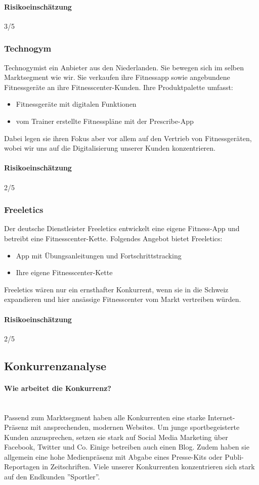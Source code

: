 \paragraph{Risikoeinschätzung} \qquad {} 3/5
\pagebreak
\subsubsection{Technogym}
Technogym\cite{technogym}ist ein Anbieter aus den Niederlanden. Sie bewegen sich im selben Marktsegment wie wir. Sie verkaufen ihre Fitnessapp sowie angebundene Fitnessgeräte an ihre Fitnesscenter-Kunden.
Ihre Produktpalette umfasst:
\begin{itemize}
	\item Fitnessgeräte mit digitalen Funktionen
	\item vom Trainer erstellte Fitnesspläne mit der Prescribe-App
\end{itemize}
Dabei legen sie ihren Fokus aber vor allem auf den Vertrieb von Fitnessgeräten, wobei wir uns auf die Digitalisierung unserer Kunden konzentrieren.
\paragraph{Risikoeinschätzung} \qquad {} 2/5
\subsubsection{Freeletics}
Der deutsche Dienstleister Freeletics\cite{freeletics} entwickelt eine eigene Fitness-App und betreibt eine Fitnesscenter-Kette.
Folgendes Angebot bietet Freeletics:
\begin{itemize}
	\item App mit Übungsanleitungen und Fortschrittstracking
	\item Ihre eigene Fitnesscenter-Kette
\end{itemize}
Freeletics wären nur ein ernsthafter Konkurrent, wenn sie in die Schweiz expandieren und hier ansässige Fitnesscenter vom Markt vertreiben würden.
\paragraph{Risikoeinschätzung} \qquad {} 2/5
\subsection{Konkurrenzanalyse}
\paragraph{Wie arbeitet die Konkurrenz?} \hfill \\
Passend zum Marktsegment haben alle Konkurrenten eine starke Internet-Präsenz mit ansprechenden, modernen Websites. 
Um junge sportbegeisterte Kunden anzusprechen, setzen sie stark auf Social Media Marketing über Facebook, Twitter und Co. Einige betreiben auch einen Blog. Zudem haben sie allgemein eine hohe Medienpräsenz mit Abgabe eines Presse-Kits oder Publi-Reportagen in Zeitschriften. Viele unserer Konkurrenten konzentrieren sich stark auf den Endkunden ''Sportler''.


